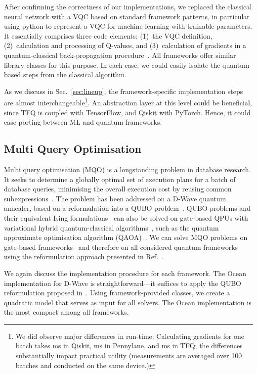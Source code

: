 \documentclass[conference]{IEEEtran}
\begin{document}
After confirming the correctness of our implementations, we replaced the classical neural network
with a VQC based on standard framework patterns, in particular using python to represent
a VQC for machine learning with trainable parameters. It essentially comprises three 
code elements: (1)~the VQC definition, (2)~calculation and processing of Q-values, 
and (3)~calculation of gradients in a quantum-classical back-propagation
procedure~\cite{mitarai2018quantum, schuld2019evaluating}. All frameworks offer similar library
classes for this purpose. In each case, we could easily isolate the quantum-based steps from the classical
algorithm.

As we discuss in Sec.~\ref{sec:lineup}, the framework-specific implementation 
steps are almost interchangeable\footnote{We did observe major differences in run-time: Calculating
gradients for one batch takes  ms in Qiskit,  ms in Pennylane,
and  ms in TFQ; the differences substantially impact practical utility (measurements
are averaged over 100 batches and conducted on the same device.)}.
An abstraction layer at this level could be beneficial, since TFQ is coupled with TensorFlow,
and Qiskit with PyTorch. Hence, it could ease porting between ML and quantum frameworks.

\subsection{Multi Query Optimisation}
Multi query optimisation (MQO) is a longstanding problem in database research.
It seeks to determine a globally optimal set of execution plans for a batch of database queries, minimising the
overall execution cost by reusing common subexpressions~\cite{DBLP:reference/db/Roy018}. The problem has been addressed on
a D-Wave quantum annealer, based on a reformulation into a QUBO problem~\cite{Trummer.2016}. QUBO problems and their
equivalent Ising formulations~\cite{Bian.2010} can also be solved on gate-based QPUs with variational
hybrid quantum-classical algorithms~\cite{McClean.2016}, such as the quantum approximate optimisation
algorithm (QAOA)~\cite{Farhi.2014}. We can solve MQO problems on gate-based
frameworks~\cite{schoenberger2021quantumqueryopt, fankhauser2021multiple} and therefore on all considered quantum frameworks
using the reformulation approach presented in Ref.~\cite{Trummer.2016}.

We again discuss the implementation procedure for each framework. The Ocean implementation for D-Wave 
is straightforward---it suffices to apply the QUBO reformulation proposed in~\cite{Trummer.2016}. Using
framework-provided classes, we create a quadratic model that serves as input for all solvers.
The Ocean implementation is the most compact among all frameworks.
\end{document}
